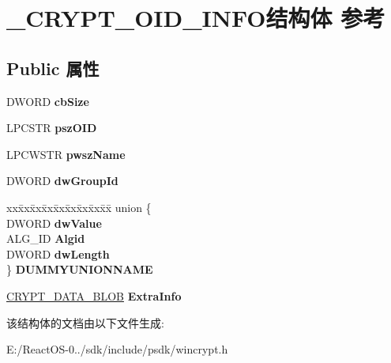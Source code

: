 \hypertarget{struct___c_r_y_p_t___o_i_d___i_n_f_o}{}\section{\+\_\+\+C\+R\+Y\+P\+T\+\_\+\+O\+I\+D\+\_\+\+I\+N\+F\+O结构体 参考}
\label{struct___c_r_y_p_t___o_i_d___i_n_f_o}
\subsection*{Public 属性}
\begin{DoxyCompactItemize}
\item 
\mbox{\label{struct___c_r_y_p_t___o_i_d___i_n_f_o_a3450d223a6da3fcd17b8b3b67ea7f7c8}} 
D\+W\+O\+RD {\bfseries cb\+Size}
\item 
\mbox{\label{struct___c_r_y_p_t___o_i_d___i_n_f_o_aa2826ee2ab25fc7f597201e5e0b47f94}} 
L\+P\+C\+S\+TR {\bfseries psz\+O\+ID}
\item 
\mbox{\label{struct___c_r_y_p_t___o_i_d___i_n_f_o_a5307bad486e41020834cefd33bf95ea6}} 
L\+P\+C\+W\+S\+TR {\bfseries pwsz\+Name}
\item 
\mbox{\label{struct___c_r_y_p_t___o_i_d___i_n_f_o_aa382821e8c4e886e3b7d744720905e44}} 
D\+W\+O\+RD {\bfseries dw\+Group\+Id}
\item 
\mbox{\label{struct___c_r_y_p_t___o_i_d___i_n_f_o_ad6b5ed307071a84c2302f4c0ced9adaa}} 
\begin{tabbing}
xx\=xx\=xx\=xx\=xx\=xx\=xx\=xx\=xx\=\kill
union \{\\
\>DWORD {\bfseries dwValue}\\
\>ALG\_ID {\bfseries Algid}\\
\>DWORD {\bfseries dwLength}\\
\} {\bfseries DUMMYUNIONNAME}\\

\end{tabbing}\item 
\mbox{\label{struct___c_r_y_p_t___o_i_d___i_n_f_o_a5939b7e379b85db9a87e2f8e565602ad}} 
\hyperlink{struct___c_r_y_p_t_o_a_p_i___b_l_o_b}{C\+R\+Y\+P\+T\+\_\+\+D\+A\+T\+A\+\_\+\+B\+L\+OB} {\bfseries Extra\+Info}
\end{DoxyCompactItemize}


该结构体的文档由以下文件生成\+:\begin{DoxyCompactItemize}
\item 
E\+:/\+React\+O\+S-\/0../sdk/include/psdk/wincrypt.\+h\end{DoxyCompactItemize}
